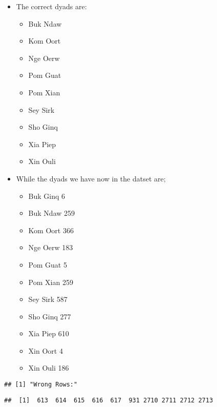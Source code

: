 \documentclass[
]{article}
\providecommand{\tightlist}{%
  \setlength{\itemsep}{0pt}\setlength{\parskip}{0pt}}
\begin{document}
\begin{itemize}
\tightlist
\item
  The correct dyads are:

  \begin{itemize}
  \tightlist
  \item
    Buk Ndaw\\
  \item
    Kom Oort\\
  \item
    Nge Oerw\\
  \item
    Pom Guat\\
  \item
    Pom Xian\\
  \item
    Sey Sirk\\
  \item
    Sho Ginq\\
  \item
    Xia Piep\\
  \item
    Xin Ouli
  \end{itemize}
\item
  While the dyads we have now in the datset are;

  \begin{itemize}
  \tightlist
  \item
    Buk Ginq 6
  \item
    Buk Ndaw 259
  \item
    Kom Oort 366
  \item
    Nge Oerw 183
  \item
    Pom Guat 5
  \item
    Pom Xian 259
  \item
    Sey Sirk 587
  \item
    Sho Ginq 277
  \item
    Xia Piep 610
  \item
    Xin Oort 4
  \item
    Xin Ouli 186
  \end{itemize}
\end{itemize}

\begin{verbatim}
## [1] "Wrong Rows:"
\end{verbatim}

\begin{verbatim}
##  [1]  613  614  615  616  617  931 2710 2711 2712 2713
\end{verbatim}
\end{document}
